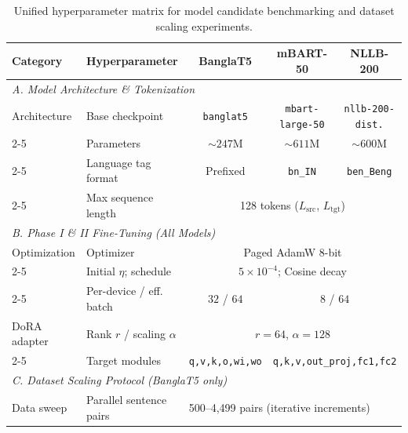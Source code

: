 \documentclass[12pt,a4paper]{article}
\begin{document}
\begin{table}[!htbp]
\centering
\caption{Unified hyperparameter matrix for model candidate benchmarking and dataset scaling experiments.}
\label{tab:model_hyperparams}
\scriptsize
\begin{threeparttable}
\begin{tabular}{|l|l|c|c|c|}
\hline
\textbf{Category} & \textbf{Hyperparameter} & \textbf{BanglaT5} & \textbf{mBART-50} & \textbf{NLLB-200} \\
\hline
\multicolumn{5}{|l|}{\textit{A. Model Architecture \& Tokenization}} \\
\hline
Architecture  & Base checkpoint        & \texttt{banglat5}\tnote{a}   & \texttt{mbart-large-50}\tnote{b} & \texttt{nllb-200-dist.}\tnote{c} \\
\cline{2-5}
              & Parameters             & ${\sim}247$M                 & ${\sim}611$M                     & ${\sim}600$M                     \\
\cline{2-5}
              & Language tag format    & Prefixed                     & \texttt{bn\_IN}                  & \texttt{ben\_Beng}               \\
\cline{2-5}
              & Max sequence length    & \multicolumn{3}{c|}{128 tokens ($L_\text{src}$, $L_\text{tgt}$)}            \\
\hline
\multicolumn{5}{|l|}{\textit{B. Phase I \& II Fine-Tuning (All Models)}} \\
\hline
Optimization  & Optimizer              & \multicolumn{3}{c|}{Paged AdamW 8-bit}                                      \\
\cline{2-5}
              & Initial $\eta$; schedule & \multicolumn{3}{c|}{$5\times10^{-4}$; Cosine decay}                       \\
\cline{2-5}
              & Per-device / eff. batch & $32$ / $64$\tnote{d}        & \multicolumn{2}{c|}{$8$ / $64$\tnote{e}}     \\
\hline
DoRA adapter  & Rank $r$ / scaling $\alpha$ & \multicolumn{3}{c|}{$r=64$, $\alpha=128$}                              \\
\cline{2-5}
              & Target modules         & \texttt{q,v,k,o,wi,wo}       & \multicolumn{2}{c|}{\texttt{q,k,v,out\_proj,fc1,fc2}} \\
\hline
\multicolumn{5}{|l|}{\textit{C. Dataset Scaling Protocol (BanglaT5 only)}} \\
\hline
Data sweep    & Parallel sentence pairs & \multicolumn{3}{l|}{500–4,499 pairs (iterative increments)}               \\

\end{tabular}
\end{threeparttable}
\end{table}
\end{document}
